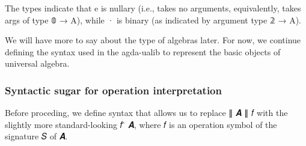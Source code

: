 \documentclass[sigplan,screen]{acmart}
\begin{document}
The types indicate that e is nullary (i.e., takes no arguments, equivalently, takes args of type 𝟘 → A), while · is binary (as indicated  by argument type 𝟚 → A).

We will have more to say about the type of algebras later.  For now, we continue defining the syntax used in the agda-ualib to represent the basic objects of universal algebra.

\subsubsection{Syntactic sugar for operation interpretation}
Before proceding, we define syntax that allows us to replace ∥ 𝑨 ∥ 𝑓 with the slightly more standard-looking 𝑓 ̂ 𝑨, where 𝑓 is an operation symbol of the signature 𝑆 of 𝑨.

\begin{code}%
\>[0]\AgdaSpace{}%
\AgdaModule{\AgdaUnderscore{}}\AgdaSpace{}%
\AgdaSymbol{\{}\AgdaSpace{}%
\AgdaSymbol{:}\AgdaSpace{}%
\AgdaSpace{}%
\AgdaSpace{}%
\AgdaSymbol{\}}%
\>[30]\<%
\\
%
\\[\AgdaEmptyExtraSkip]%
\>[0][@{}l@{\AgdaIndent{0}}]%
\>[1]\AgdaSpace{}%
\AgdaSymbol{:}\AgdaSpace{}%
\AgdaSymbol{(}\AgdaSpace{}%
\AgdaSymbol{:}\AgdaSpace{}%
\AgdaSpace{}%
\AgdaSpace{}%
\AgdaSymbol{)}\<%
\\
\>[1][@{}l@{\AgdaIndent{0}}]%
\>[2]%
\>[6]\AgdaSymbol{(}\AgdaSpace{}%
\AgdaSymbol{:}\AgdaSpace{}%
\AgdaSpace{}%
\AgdaSpace{}%
\AgdaSymbol{)}\<%
\\
%
\>[2]%
\>[6]\AgdaSymbol{(}\AgdaSpace{}%
\AgdaSpace{}%
\AgdaSpace{}%
%
\>[16]%
\>[19]\AgdaSpace{}%
\AgdaSpace{}%
\AgdaSymbol{)}\AgdaSpace{}%
\AgdaSpace{}%
\AgdaSpace{}%
\AgdaSpace{}%
\<%
\\
%
\\[\AgdaEmptyExtraSkip]%
%
\>[1]\AgdaSpace{}%
\AgdaSpace{}%
\AgdaSpace{}%
\AgdaSymbol{=}\AgdaSpace{}%
\AgdaSpace{}%
\AgdaSpace{}%
\AgdaSpace{}%
\AgdaSymbol{(}\AgdaSpace{}%
\AgdaSpace{}%
\AgdaSpace{}%
\AgdaSymbol{)}\AgdaSpace{}%
\<%
\\
%
\\[\AgdaEmptyExtraSkip]%
%
\>[1]\AgdaSpace{}%
\AgdaSpace{}%
\<%
\end{code}
\end{document}
